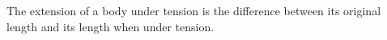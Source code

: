  The extension of a body under tension is the difference
between its original length and its length when under tension.
